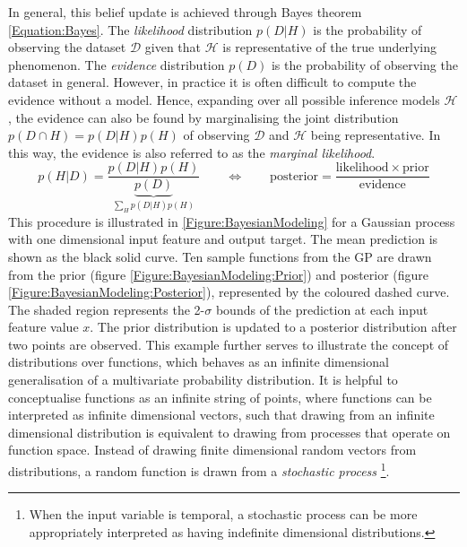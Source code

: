 			In general, this belief update is achieved through Bayes theorem \eqref{Equation:Bayes}. The \textit{likelihood} distribution $p(D | H)$ is the probability of observing the dataset $\mathcal{D}$ given that $\mathcal{H}$ is representative of the true underlying phenomenon. The \textit{evidence} distribution $p(D)$ is the probability of observing the dataset in general. However, in practice it is often difficult to compute the evidence without a model. Hence, expanding over all possible inference models $\mathcal{H}$, the evidence can also be found by marginalising the joint distribution $p(D \cap H) = p(D | H) p(H)$ of observing $\mathcal{D}$ and $\mathcal{H}$ being representative. In this way, the evidence is also referred to as the \textit{marginal likelihood}. \begin{equation}
				p(H | D) = \frac{p(D | H) p(H)}{\underbrace{p(D)}_{\sum_{H} p(D | H) p(H)}} \qquad \Longleftrightarrow \qquad \mathrm{posterior} = \frac{\mathrm{likelihood} \times \mathrm{prior}}{\mathrm{evidence}}
			\label{Equation:Bayes}
			\end{equation} This procedure is illustrated in \cref{Figure:BayesianModeling} for a Gaussian process with one dimensional input feature and output target. The mean prediction is shown as the black solid curve. Ten sample functions from the GP are drawn from the prior (figure \ref{Figure:BayesianModeling:Prior}) and posterior (figure \ref{Figure:BayesianModeling:Posterior}), represented by the coloured dashed curve. The shaded region represents the 2-$\sigma$ bounds of the prediction at each input feature value $x$. The prior distribution is updated to a posterior distribution after two points are observed. This example further serves to illustrate the concept of distributions over functions, which behaves as an infinite dimensional generalisation of a multivariate probability distribution. It is helpful to conceptualise functions as an infinite string of points, where functions can be interpreted as infinite dimensional vectors, such that drawing from an infinite dimensional distribution is equivalent to drawing from processes that operate on function space. Instead of drawing finite dimensional random vectors from distributions, a random function is drawn from a \textit{stochastic process} \footnote{When the input variable is temporal, a stochastic process can be more appropriately interpreted as having indefinite dimensional distributions.}.
			
